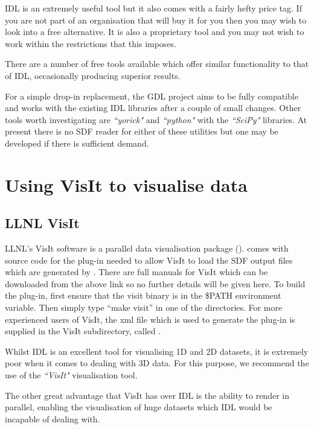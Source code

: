   IDL is an extremely useful tool but it also comes with a fairly hefty
  price tag. If you are not part of an organisation that will buy it for
  you then you may wish to look into a free alternative. It is also a
  proprietary tool and you may not wish to work within the restrictions
  that this imposes.

  There are a number of free tools available which offer similar functionality
  to that of IDL, occasionally producing superior results.

  For a simple drop-in replacement, the GDL project aims to be fully compatible
  and works with the existing {\EPOCH} IDL libraries after a couple of small
  changes. Other tools worth investigating are {\em ``yorick"} and
  {\em ``python"} with the {\em ``SciPy"} libraries. At present there is
  no SDF reader for either of these utilities but one may be developed if
  there is sufficient demand.

\section{Using VisIt to visualise data}

\subsection{LLNL VisIt}
LLNL's VisIt software is a parallel data visualisation package
(). {\EPOCH} comes with source
code for the plug-in needed to allow VisIt to load the SDF output files which
are generated by {\EPOCH}. There are full manuals for VisIt which can be
downloaded from the above link so no further details will be given here. To
build the plug-in, first ensure that the visit binary is in the \$PATH
environment variable. Then simply type ``make visit'' in one of the
 directories.
For more experienced
users of VisIt, the xml file which is used to generate the plug-in is supplied
in the VisIt subdirectory, called .

  Whilst IDL is an excellent tool for visualising 1D and 2D datasets, it
  is extremely poor when it comes to dealing with 3D data. For this purpose,
  we recommend the use of the {\em ``VisIt"} visualisation tool.

  The other great advantage that VisIt has over IDL is the ability to
  render in parallel, enabling the visualisation of huge datasets which
  IDL would be incapable of dealing with.

